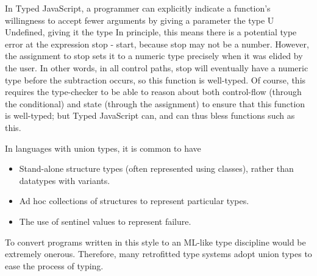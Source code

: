In Typed JavaScript, a programmer can explicitly indicate a function’s
willingness to accept fewer arguments by giving a parameter the type U
Undefined, giving it the type
In principle, this means there is a potential type error at the expression stop
- start, because stop may not be a number. However, the assignment to stop sets
it to a numeric type precisely when it was elided by the user. In other words,
in all control paths, stop will eventually have a numeric type before the
subtraction occurs, so this function is well-typed. Of course, this requires the
type-checker to be able to reason about both control-flow (through the
conditional) and state (through the assignment) to ensure that this function is
well-typed; but Typed JavaScript can, and can thus bless functions such as this.


In languages with union types, it is common to have
\begin{itemize}[nosep]
  \item 
Stand-alone structure types (often represented using classes), rather than
datatypes with variants.
  \item 
Ad hoc collections of structures to represent particular types.
  \item 
The use of sentinel values to represent failure.
\end{itemize}
To convert programs written in this style to an ML-like type discipline would be
extremely onerous. Therefore, many retrofitted type systems adopt union types to
ease the process of typing.

